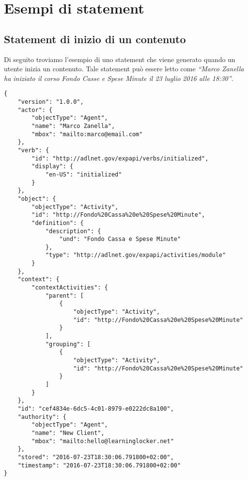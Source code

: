 \section{Esempi di statement} \label{App:AppendixA}
    \subsection{Statement di inizio di un contenuto}
    Di seguito troviamo l'esempio di uno statement che viene generato quando un utente inizia un contenuto. Tale statement può essere letto come \textit{``Marco Zanella ha iniziato il corso Fondo Casse e Spese Minute il 23 luglio 2016 alle 18:30''}.
\begin{lstlisting}
{
    "version": "1.0.0",
    "actor": {
        "objectType": "Agent",
        "name": "Marco Zanella",
        "mbox": "mailto:marco@email.com"
    },
    "verb": {
        "id": "http://adlnet.gov/expapi/verbs/initialized",
        "display": {
            "en-US": "initialized"
        }
    },
    "object": {
        "objectType": "Activity",
        "id": "http://Fondo%20Cassa%20e%20Spese%20Minute",
        "definition": {
            "description": {
                "und": "Fondo Cassa e Spese Minute"
            },
            "type": "http://adlnet.gov/expapi/activities/module"
        }
    },
    "context": {
        "contextActivities": {
            "parent": [
                {
                    "objectType": "Activity",
                    "id": "http://Fondo%20Cassa%20e%20Spese%20Minute"
                }
            ],
            "grouping": [
                {
                    "objectType": "Activity",
                    "id": "http://Fondo%20Cassa%20e%20Spese%20Minute"
                }
            ]
        }
    },
    "id": "cef4834e-6dc5-4c01-8979-e0222dc8a100",
    "authority": {
        "objectType": "Agent",
        "name": "New Client",
        "mbox": "mailto:hello@learninglocker.net"
    },
    "stored": "2016-07-23T18:30:06.791800+02:00",
    "timestamp": "2016-07-23T18:30:06.791800+02:00"
}
\end{lstlisting}

